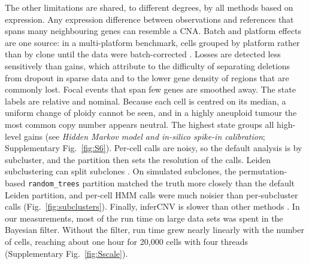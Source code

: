 The other limitations are shared, to different degrees, by all methods based on expression. Any expression difference between observations and references that spans many neighbouring genes can resemble a CNA. Batch and platform effects are one source: in a multi-platform benchmark, cells grouped by platform rather than by clone until the data were batch-corrected \citep{chen2025}. Losses are detected less sensitively than gains, which \citet{schmid2025} attribute to the difficulty of separating deletions from dropout in sparse data and to the lower gene density of regions that are commonly lost. Focal events that span few genes are smoothed away. The state labels are relative and nominal. Because each cell is centred on its median, a uniform change of ploidy cannot be seen, and in a highly aneuploid tumour the most common copy number appears neutral. The highest state groups all high-level gains (see \emph{Hidden Markov model and in-silico spike-in calibration}; Supplementary Fig.~\ref{fig:S6}). Per-cell calls are noisy, so the default analysis is by subcluster, and the partition then sets the resolution of the calls. Leiden subclustering can split subclones \citep{chang2026preprint}. On simulated subclones, the permutation-based \texttt{random\_trees} partition matched the truth more closely than the default Leiden partition, and per-cell HMM calls were much noisier than per-subcluster calls (Fig.~\ref{fig:subclusters}). Finally, inferCNV is slower than other methods \citep{schmid2025, chang2026preprint}. In our measurements, most of the run time on large data sets was spent in the Bayesian filter. Without the filter, run time grew nearly linearly with the number of cells, reaching about one hour for 20,000 cells with four threads (Supplementary Fig.~\ref{fig:Sscale}).

